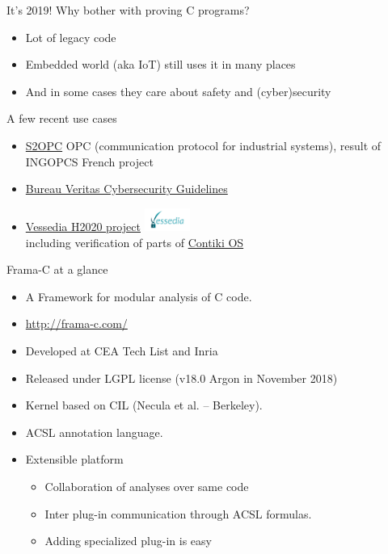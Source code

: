 \documentclass[pdf,xcolor={svgnames}]{beamer}
\begin{document}
\begin{frame}{It's 2019! Why bother with proving C programs?}
\begin{itemize}
\item Lot of legacy code
\item Embedded world (aka IoT) still uses it in many places
\item And in some cases they care about safety and (cyber)security
\end{itemize}
\begin{block}{A few recent use cases}
\begin{itemize}
\item \href{https://gitlab.com/systerel/S2OPC/}{S2OPC}
  OPC (communication protocol for industrial systems), result of INGOPCS
  French project
\item \href{https://www.bureauveritas.com/white-papers/cybersecurity-guidelines-for-development-and-assessment-bv-sw-200}{Bureau Veritas Cybersecurity Guidelines}
\item \href{https://www.vessedia.eu/}{Vessedia H2020 project} \includegraphics[align=c,width=1.5cm]{vessedia-logo}\\
including verification of parts of \href{http://www.contiki-os.org/}{Contiki OS}
\end{itemize}
\end{block}
\end{frame}

\begin{frame}{Frama-C at a glance}
\begin{itemize}
\item
  A \alert{Fra}mework for \alert{m}odular \alert{a}nalysis of \alert{C} code.
\item \url{http://frama-c.com/}
\item Developed at CEA Tech List and Inria
\item Released under LGPL license (v18.0 Argon in November 2018)
\item Kernel based on CIL (Necula et al. -- Berkeley).
\item ACSL annotation language.
\item Extensible platform
\begin{itemize}
\item Collaboration of analyses over same code
\item Inter plug-in communication through ACSL formulas.
\item Adding specialized plug-in is easy
\end{itemize}
\end{itemize}
\end{frame}
\end{document}
